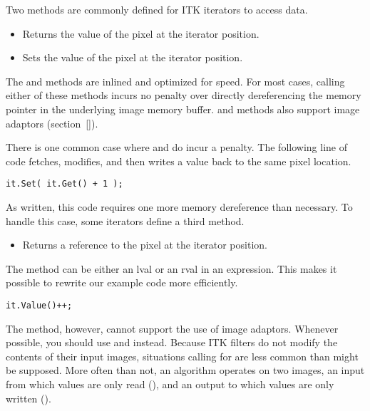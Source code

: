 Two methods are commonly defined for ITK iterators to access data.

\begin{itemize}
\item \textbf{} Returns the value of the pixel at the
iterator position.

\item \textbf{}Sets the value of the pixel at the
iterator position.
\end{itemize}


The  and  methods are inlined and optimized for speed. For
most cases, calling either of these methods incurs no penalty over directly
dereferencing the memory pointer in the underlying image memory buffer.
 and  methods also support image adaptors (section~\ref{}).

There is one common case where  and  do incur a penalty.
The following line of code fetches, modifies, and then writes a value back to
the same pixel location.

\begin{verbatim}
it.Set( it.Get() + 1 );
\end{verbatim}

As written, this code requires one more memory dereference than necessary.  To
handle this case, some iterators define a third method.

\begin{itemize}
\item \textbf{} Returns a reference to the pixel at
the iterator position.
\end{itemize}

The  method can be either an lval or an rval in an expression.  This
makes it possible to rewrite our example code more efficiently.

\begin{verbatim}
it.Value()++;
\end{verbatim}

The  method, however, cannot support the use of image adaptors.
Whenever possible, you should use  and  instead.  Because
ITK filters do not modify the contents of their input images, situations
calling for  are less common than might be supposed.  More often
than not, an algorithm operates on two images, an input from which values are
only read (), and an output to which values are only written
().

